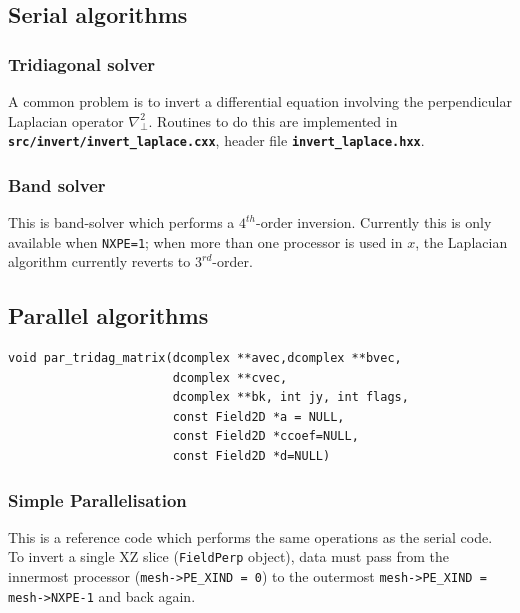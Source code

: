 \documentclass[12pt]{article}
\newcommand{\code}[1]{\texttt{#1}}
\newcommand{\file}[1]{\texttt{\bf #1}}
\begin{document}
\subsection{Serial algorithms}

\subsubsection{Tridiagonal solver}

A common problem is to invert a differential equation involving the perpendicular
Laplacian operator $\nabla_\perp^2$. Routines to do this are implemented in
\file{src/invert/invert\_laplace.cxx}, header file \file{invert\_laplace.hxx}.

\subsubsection{Band solver}

This is band-solver which performs a $4^{th}$-order inversion. Currently this
is only available when \code{NXPE=1}; when more than one processor is used in $x$,
the Laplacian algorithm currently reverts to $3^{rd}$-order.

\subsection{Parallel algorithms}

\begin{lstlisting}
void par_tridag_matrix(dcomplex **avec,dcomplex **bvec,
                       dcomplex **cvec,
                       dcomplex **bk, int jy, int flags, 
                       const Field2D *a = NULL, 
                       const Field2D *ccoef=NULL,
                       const Field2D *d=NULL)
\end{lstlisting}

\subsubsection{Simple Parallelisation}

This is a reference code which performs the same operations as the serial code.
To invert a single XZ slice (\lstinline!FieldPerp! object), data must pass
from the innermost processor (\lstinline!mesh->PE_XIND = 0!) to the outermost
\lstinline!mesh->PE_XIND = mesh->NXPE-1! and back again.
\end{document}

